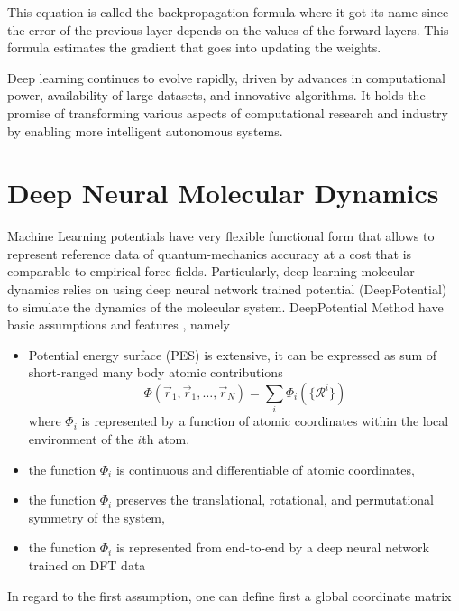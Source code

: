 This equation is  called the backpropagation formula where it got its name
since the error
of the
previous layer depends on the values of the forward layers. This formula
estimates the gradient that goes into updating the weights.

Deep learning continues to evolve rapidly, driven by advances in
computational power, availability of large datasets, and innovative algorithms.
It holds the promise of transforming various aspects of computational research
and industry
by enabling more intelligent autonomous systems.

\section{Deep Neural Molecular Dynamics}
Machine Learning potentials have very flexible functional form that allows to
represent reference data of quantum-mechanics accuracy at a cost that is
comparable to empirical force fields. Particularly, deep learning molecular
dynamics relies on using deep neural network trained potential (DeepPotential)
to simulate the
dynamics of the molecular system.  DeepPotential Method have basic assumptions
and features
\cite{zhang2018deep,zhang2018end},
namely

\begin{itemize}

    \item  Potential energy surface (PES) is extensive, it can be expressed as
          sum		of	     short-ranged many body atomic
          contributions
          \begin{equation}
              \Phi(\vec{r}_1,\vec{r}_1,\hdots, \vec{r}_N) = \sum_i
              \Phi_i(\{\mathcal{R}^i\})
          \end{equation}
          where $\Phi_i$ is represented by	     a		 function
          of atomic coordinates within the local environment of      the
          $i$th atom.
    \item  the function $\Phi_i$ is continuous and differentiable
          of atomic coordinates,
    \item the function $\Phi_i$ preserves the translational, rotational,
          and
          permutational symmetry of the system,
    \item the function $\Phi_i$ is represented from end-to-end by a deep
          neural network trained on DFT data
\end{itemize}

In regard to the first assumption, one can define first a global coordinate
matrix

